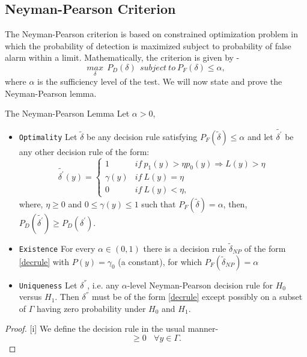 \documentclass[a4paper,english,12pt]{article}
\begin{document}
\subsection{Neyman-Pearson Criterion}
The Neyman-Pearson criterion is based on constrained optimization problem in which the probability of detection is maximized subject to probability of false alarm within a limit. Mathematically, the criterion is given by -
\begin{equation}
\underset{\delta}{max}~~P_{D} (\delta)~~ subject~ to~ P_F(\delta) \le \alpha,
\end{equation}
where $\alpha$ is the sufficiency level of the test. We will now state and prove the Neyman-Pearson lemma.
\begin{lem}{The Neyman-Pearson Lemma}
Let $\alpha > 0$, 
\begin{itemize}
\item[i] \texttt{Optimality} Let $\tilde{\delta}$ be any decision rule satisfying $P_F(\tilde{\delta}) \le \alpha$ and let $\tilde{\delta^{'}}$ be any other decision rule of the form:
\begin{equation}
\label{decrule}
\tilde{\delta^{'}} (y) = 
\begin{cases}
1 &if~p_{1}(y) > \eta p_0 (y) \Rightarrow L(y) > \eta\\
\gamma(y) &if~L(y) = \eta\\
0 &if~L(y) < \eta,
\end{cases}
\end{equation}
where, $\eta \geq 0$ and $0 \leq \gamma(y) \leq 1$ such that $P_F(\tilde{\delta}) = \alpha$, then, $P_D(\tilde{\delta^{'}}) \geq P_D(\delta^{'})$.
\item[ii] \texttt{Existence} For every $\alpha \in (0,1)$ there is a decision rule $\tilde{\delta}_{NP}$ of the form \ref{decrule} with $P(y) = \gamma_0$ (a constant), for which $P_F(\tilde{\delta}_{NP}) = \alpha$
\item[iii] \texttt{Uniqueness} Let $\delta^{''}$, i.e. any $\alpha$-level Neyman-Pearson decision rule for $H_0$ versus $H_1$. Then $\delta^{''}$ must be of the form \ref{decrule} except possibly on a subset of $\Gamma$ having zero probability under $H_0$ and $H_1$.
\end{itemize}
\begin{proof}{}
[i] We define the decision rule in the usual manner-
\begin{equation}
[\tilde{\delta}^{'} (y) - \tilde{\delta} (y) ][p_1(y) - \eta p_0(y)] \geq 0 ~~~~ \forall y\in \Gamma.
\end{equation}

\end{proof}
\end{lem}
\end{document}
